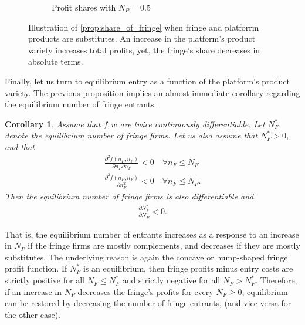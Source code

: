 \documentclass[a4paper]{article}
\newtheorem{corollary}{Corollary}
\begin{document}
\begin{figure}[ht]
\begin{subfigure}[b]{0.45\textwidth}
        \caption{Profit shares with $N_P = 0.5$}
    \end{subfigure}
    \caption{Illustration of \cref{prop:share_of_fringe} when fringe and platforrm products are substitutes. An increase in the platform's product variety increases total profits, yet, the fringe's share decreases in absolute terms.}
    \label{fig:increase_N_P_fringe}
\end{figure}

Finally, let us turn to equilibrium entry as a function of the platform's product variety.
The previous proposition implies an almost immediate corollary regarding the equilibrium number of fringe entrants.
\begin{corollary}
    \label{cor:fringe_entry}
    Assume that $f, w$ are twice continuously differentiable.
    Let $N_F^*$ denote the equilibrium number of fringe firms.
    Let us also assume that $N_F^* > 0$, and that
    \begin{align*}
        \frac{\partial^2 f(n_P, n_F)}{\partial n_P \partial n_F} < 0 \quad \forall n_F \leq N_F \\
        \frac{\partial^2 f(n_P, n_F)}{\partial n_F^2} < 0 \quad \forall n_F \leq N_F.
    \end{align*}
    Then the equilibrium number of fringe firms is also differentiable and
    \begin{align*}
        \frac{\partial N_F^*}{\partial N_P} < 0.
    \end{align*}
\end{corollary}
That is, the equilibrium number of entrants increases as a response to an increase in $N_P$ if the fringe firms are mostly complements, and decreases if they are mostly substitutes.
The underlying reason is again the concave or hump-shaped fringe profit function.
If $N_F^*$ is an equilibrium, then fringe profits minus entry costs are strictly positive for all $N_F \leq N_F^*$ and strictly negative for all $N_F > N_F^*$.
Therefore, if an increase in $N_P$ decreases the fringe's profits for every $N_F \geq 0$, equilibrium can be restored by decreasing the number of fringe entrants, (and vice versa for the other case).
\end{document}
